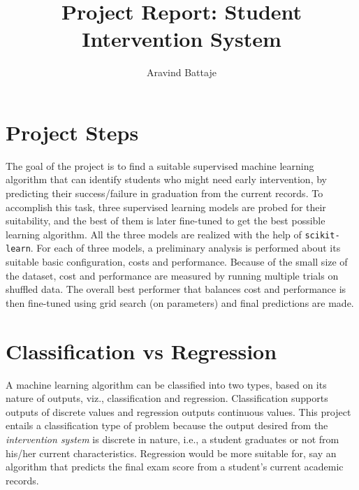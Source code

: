 \documentclass{article}
\begin{document}
	
	\title{Project Report: Student Intervention System}
	\author{Aravind Battaje}
	\maketitle
	
	\section{Project Steps}
	The goal of the project is to find a suitable supervised machine learning algorithm that can identify students who might need early intervention, by predicting their success/failure in graduation from the current records. To accomplish this task, three supervised learning models are probed for their suitability, and the best of them is later fine-tuned to get the best possible learning algorithm. All the three models are realized with the help of \texttt{scikit-learn}. For each of three models, a preliminary analysis is performed about its suitable basic configuration, costs and performance. Because of the small size of the dataset, cost and performance are measured by running multiple trials on shuffled data. The overall best performer that balances cost and performance is then fine-tuned using grid search (on parameters) and final predictions are made.
	
	
	\section{Classification vs Regression}
	A machine learning algorithm can be classified into two types, based on its nature of outputs, viz., classification and regression. Classification supports outputs of discrete values and regression outputs continuous values. This project entails a classification type of problem because the output desired from the \emph{intervention system} is discrete in nature, i.e., a student graduates or not from his/her current characteristics. Regression would be more suitable for, say an algorithm that predicts the final exam score from a student's current academic records.
	
	
\end{document}
